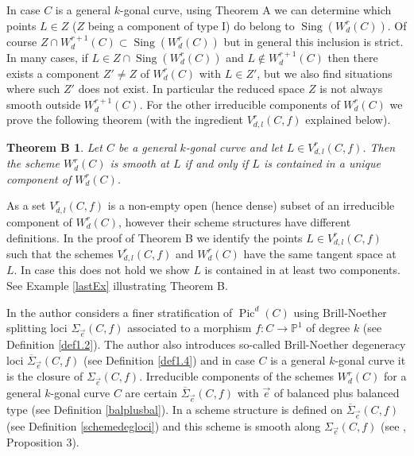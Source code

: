 \documentclass{article}
\DeclareMathOperator{\Pic}{Pic}
\DeclareMathOperator{\Sing}{Sing}
\newtheorem*{theoremB}{Theorem B}
\theoremstyle{definition}
\theoremstyle{remark}
\begin{document}
In case $C$ is a general $k$-gonal curve, using Theorem A we can determine which points $L \in Z$ ($Z$ being a component of type I) do belong to $\Sing (W^r_d(C))$.
Of course $Z \cap W^{r+1}_d(C) \subset \Sing (W^r_d(C))$ but in general this inclusion is strict.
In many cases, if $L \in Z \cap \Sing (W^r_d(C))$ and $L \notin W^{r+1}_d(C)$ then there exists a component $Z' \neq Z$ of $W^r_d(C)$ with $L \in Z'$, but we also find situations where such $Z'$ does not exist.
In particular the reduced space $Z$ is not always smooth outside $W^{r+1}_d(C)$.
For the other irreducible components of $W^r_d(C)$ we prove the following theorem (with the ingredient $V^r_{d,l}(C,f)$ explained below).

\begin{theoremB}
Let $C$ be a general $k$-gonal curve and let $L \in V^r_{d,l}(C,f)$.
Then the scheme $W^r_d(C)$ is smooth at $L$ if and only if $L$ is contained in a unique component of $W^r_d(C)$.
\end{theoremB}

As a set $V^r_{d,l}(C,f)$ is a non-empty open (hence dense) subset of an irreducible component of $W^r_d(C)$, however their scheme structures have different definitions.
In the proof of Theorem B we identify the points $L \in V^r_{d,l}(C,f)$ such that the schemes $V^r_{d,l}(C,f)$ and $W^r_d(C)$ have the same tangent space at $L$.
In case this does not hold we show $L$ is contained in at least two components.
See Example \ref{lastEx} illustrating Theorem B.

In \cite{ref7} the author considers a finer stratification of $\Pic^d(C)$ using Brill-Noether splitting loci $\Sigma _{\overrightarrow {e}}(C,f)$ associated to a morphism $f : C \rightarrow \mathbb {P}^1$ of degree $k$ (see Definition 
\ref{def1.2}).
The author also introduces so-called Brill-Noether degeneracy loci $\overline{\Sigma}_{\overrightarrow {e}}(C,f)$ (see Definition \ref{def1.4}) and in case $C$ is a general $k$-gonal curve it is the closure of $\Sigma_{\overrightarrow {e}}(C,f)$.
Irreducible components of the schemes $W^r_d(C)$ for a general $k$-gonal curve $C$ are certain $\overline{\Sigma}_{\overrightarrow {e}}(C,f)$ with $\overrightarrow {e}$ of balanced plus balanced type (see Definition \ref{balplusbal}).
In \cite {ref6} a scheme structure is defined on $\overline {\Sigma}_{\overrightarrow {e}}(C,f)$ (see Definition \ref{schemedegloci}) and this scheme is smooth along $\Sigma _{\overrightarrow {e}}(C,f)$ (see \cite{ref2}, Proposition 3).
\end{document}

